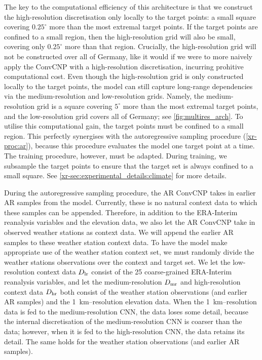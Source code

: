 \documentclass[12pt, twoside]{report}
\newcommand{\xrprefix}[1]{xr-#1}
\begin{document}
The key to the computational efficiency of this architecture is that we construct the high-resolution discretisation
only locally to the target points: a small square covering $0.25^\circ$ more than the most extremal target points.
If the target points are confined to a small region, then the high-resolution grid will also be small, covering only $0.25^\circ$ more than that region.
Crucially, the high-resolution grid will not be constructed over all of Germany, like it would if we were to more naively apply the ConvCNP with a high-resolution discretisation, incurring prohitive computational cost.
Even though the high-resolution grid is only constructed locally to the target points, the model can still capture long-range dependencies via the medium-resolution and low-resolution grids.
Namely, the medium-resolution grid is a square covering $5^\circ$ more than the most extremal target points, and the low-resolution grid covers all of Germany; see \cref{fig:multires_arch}.
To utilise this computational gain, the target points must be confined to a small region.
This perfectly synergises with the autoregressive sampling procedure (\cref{\xrprefix{proc:ar}}),
because this procedure evaluates the model one target point at a time.
The training procedure, however, must be adapted.
During training, we subsample the target points to ensure that the target set is always confined to a small square.
See \cref{\xrprefix{sec:experimental_details:climate}} for more details.

During the autoregressive sampling procedure, the AR ConvCNP takes in earlier AR samples from the model.
Currently, these is no natural context data to which these samples can be appended.
Therefore, in addition to the ERA-Interim reanalysis variables and the elevation data, we also let the AR ConvCNP take in observed weather stations as context data.
We will append the earlier AR samples to these weather station context data.
To have the model make appropriate use of the weather station context set,
we must randomly divide the weather stations observations over the context and target set.
We let the low-resolution context data $D\ss{lr}$ consist of the 25 coarse-grained ERA-Interim reanalysis variables,
and let the medium-resolution $D\ss{mr}$ and high-resolution context data $D\ss{hr}$ both consist of the weather station observations (and earlier AR samples) and the \SI{1}{km}--resolution elevation data.
When the \SI{1}{km}--resolution data is fed to the medium-resolution CNN, the data loses some detail, because the internal discretisation of the medium-resolution CNN is coarser than the data;
however, when it is fed to the high-resolution CNN, the data retains its detail.
The same holds for the weather station observations (and earlier AR samples).
\end{document}

